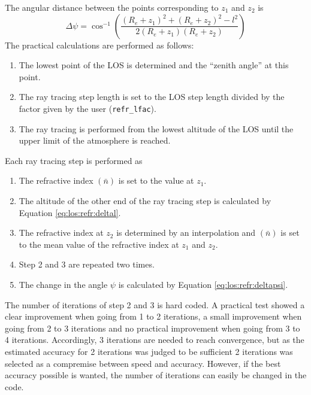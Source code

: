   The angular distance between the points corresponding to $z_1$ and $z_2$
  is
  \begin{equation}
   \Delta \psi = \cos^{-1}\left( \frac{(R_e+z_1)^2 + (R_e+z_2)^2 - l^2}
                                                 {2(R_e+z_1)(R_e+z_2)} \right) 
   \label{eq:los:refr:deltapsi}
  \end{equation}
  The practical calculations are performed as follows:
  \begin{enumerate}
    \item The lowest point of the LOS is determined and the ``zenith
          angle'' at this point. 
    \item The ray tracing step length is set to the LOS step length divided
          by the factor given by the user (\verb|refr_lfac|).
    \item The ray tracing is performed from the lowest altitude of the LOS
          until the upper limit of the atmosphere is reached.
  \end{enumerate}

  \noindent
  Each ray tracing step is performed as
  \begin{enumerate}
    \item The refractive index $(\bar{n})$ is set to the value at $z_1$.
    \item The altitude of the other end of the ray tracing step is calculated
          by Equation \ref{eq:los:refr:deltal}.
    \item The refractive index at $z_2$ is determined by an interpolation
          and $(\bar{n})$ is set to the mean value of the refractive index at
          $z_1$ and $z_2$.
    \item Step 2 and 3 are repeated two times.
    \item The change in the angle $\psi$ is calculated by Equation
          \ref{eq:los:refr:deltapsi}.
  \end{enumerate}
  The number of iterations of step 2 and 3 is hard coded. A practical
  test showed a clear improvement when going from 1 to 2 iterations, a
  small improvement when going from 2 to 3 iterations and no practical
  improvement when going from 3 to 4 iterations. Accordingly, 3
  iterations are needed to reach convergence, but as the estimated
  accuracy for 2 iterations was judged to be sufficient 2 iterations
  was selected as a compremise between speed and accuracy. However,
  if the best accuracy possible is wanted, the number of iterations
  can easily be changed in the code.


